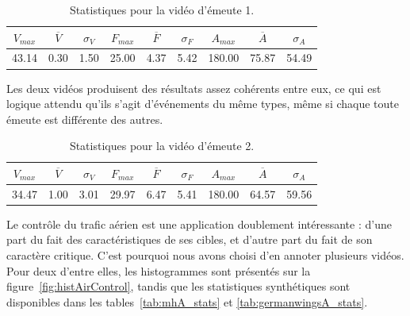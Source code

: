 \begin{table}
	\centering
	\begin{tabular}{c c c c c c c c c}
		$V_{max}$	& $\overline{V}$	& $\sigma_{V}$	& $F_{max}$	& $\overline{F}$	& $\sigma_{F}$	& $A_{max}$	& $\overline{A}$	& $\sigma_{A}$	\bigstrut[b] \\ \hline

		43.14		& 0.30				& 1.50			& 25.00		& 4.37				& 5.42			& 180.00	& 75.87				& 54.49			\bigstrut[t] \\
	\end{tabular}
	\caption[Statistiques pour la vidéo d'émeute 1]{Statistiques pour la vidéo d'émeute 1.}
	\label{tab:riot_stats}
\end{table}

	Les deux vidéos produisent des résultats assez cohérents entre eux, ce qui est logique attendu qu'ils s'agit d'événements du même types, même si chaque toute émeute est différente des autres.

\begin{table}
	\centering
	\begin{tabular}{c c c c c c c c c}
		$V_{max}$	& $\overline{V}$	& $\sigma_{V}$	& $F_{max}$	& $\overline{F}$	& $\sigma_{F}$	& $A_{max}$	& $\overline{A}$	& $\sigma_{A}$	\bigstrut[b] \\ \hline

		34.47		& 1.00				& 3.01			& 29.97		& 6.47				& 5.41			& 180.00	& 64.57				& 59.56			\bigstrut[t] \\
	\end{tabular}
	\caption[Statistiques pour la vidéo d'émeute 2]{Statistiques pour la vidéo d'émeute 2.}
	\label{tab:riot2a_stats}
\end{table}

	Le contrôle du trafic aérien est une application doublement intéressante : d'une part du fait des caractéristiques de ses cibles, et d'autre part du fait de son caractère critique. C'est pourquoi nous avons choisi d'en annoter plusieurs vidéos. Pour deux d'entre elles, les histogrammes sont présentés sur la figure~\ref{fig:histAirControl}, tandis que les statistiques synthétiques sont disponibles dans les tables~\ref{tab:mhA_stats} et \ref{tab:germanwingsA_stats}.
	
